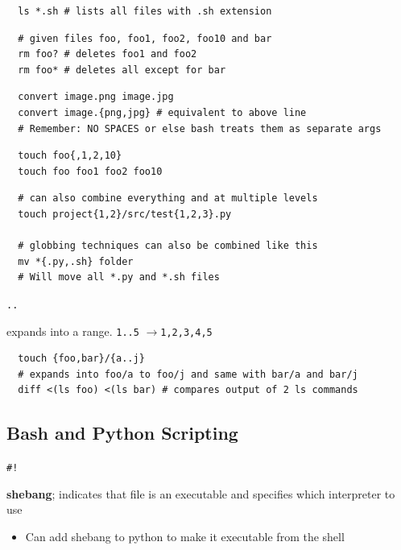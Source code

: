 \documentclass[letterpaper,12pt]{article}
\newcommand*{\lstitem}[1]{
  \setbox0\hbox{\lstinline{#1}}
  \item[\usebox0]
}
\newcommand{\lra}{\ensuremath{\longrightarrow{}}}
\begin{document}
\begin{lstlisting}
  ls *.sh # lists all files with .sh extension
\end{lstlisting}

\begin{lstlisting}
  # given files foo, foo1, foo2, foo10 and bar
  rm foo? # deletes foo1 and foo2
  rm foo* # deletes all except for bar
\end{lstlisting}

\begin{lstlisting}
  convert image.png image.jpg
  convert image.{png,jpg} # equivalent to above line
  # Remember: NO SPACES or else bash treats them as separate args
\end{lstlisting}

\begin{lstlisting}
  touch foo{,1,2,10}
  touch foo foo1 foo2 foo10
\end{lstlisting}

\begin{lstlisting}
  # can also combine everything and at multiple levels
  touch project{1,2}/src/test{1,2,3}.py

  # globbing techniques can also be combined like this
  mv *{.py,.sh} folder
  # Will move all *.py and *.sh files
\end{lstlisting}

\begin{description}
 \lstitem{..} expands into a range. \lstinline{1..5} \lra \lstinline{1,2,3,4,5}
\end{description}

\begin{lstlisting}
  touch {foo,bar}/{a..j}
  # expands into foo/a to foo/j and same with bar/a and bar/j
  diff <(ls foo) <(ls bar) # compares output of 2 ls commands
\end{lstlisting}

\subsection{Bash and Python Scripting}

\begin{description}
 \lstitem{#!} \textbf{shebang}; indicates that file is an executable and specifies which interpreter to use
\end{description}

\begin{itemize}
 \item Can add shebang to python to make it executable from the shell
\end{itemize}
\end{document}
